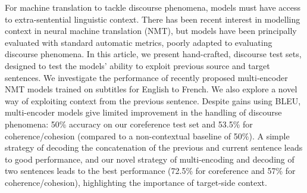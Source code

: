 For machine translation to tackle discourse phenomena, models must have access to extra-sentential linguistic context. There has been recent interest in modelling context in neural machine translation (NMT), but models have been principally evaluated with standard automatic metrics, poorly adapted to evaluating discourse phenomena. In this article, we present hand-crafted, discourse test sets, designed to test the models' ability to exploit previous source and target sentences. We investigate the performance of recently proposed multi-encoder NMT models trained on subtitles for English to French. We also explore a novel way of exploiting context from the previous sentence. Despite gains using BLEU, multi-encoder models give limited improvement in the handling of discourse phenomena: 50\% accuracy on our coreference test set and 53.5\% for coherence/cohesion (compared to a non-contextual baseline of 50\%). A simple strategy of decoding the concatenation of the previous and current sentence leads to good performance, and our novel strategy of multi-encoding and decoding of two sentences leads to the best performance (72.5\% for coreference and 57\% for coherence/cohesion), highlighting the importance of target-side context.
